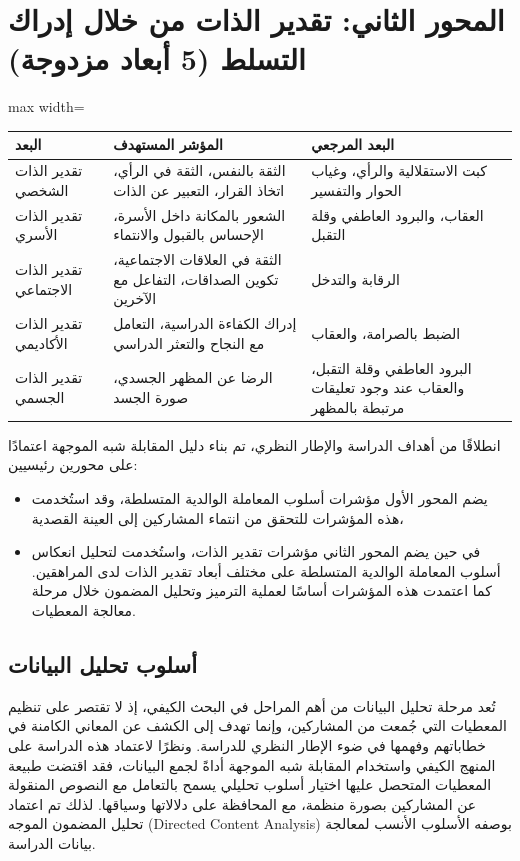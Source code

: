 \documentclass[12pt,oneside]{report}
\begin{document}
\section{المحور الثاني: تقدير الذات من خلال إدراك التسلط  (5 أبعاد مزدوجة)}
\begin{table}[H]
\centering
\small
\renewcommand{\arraystretch}{1.3}
\setlength{\tabcolsep}{4pt}
\begin{adjustbox}{max width=\textwidth}
\begin{tabular}{p{6cm} p{4cm} p{4cm}}
\toprule
\textbf{البعد} & \textbf{المؤشر المستهدف} & \textbf{البعد المرجعي} \\
\midrule
تقدير الذات الشخصي & الثقة بالنفس، الثقة في الرأي، اتخاذ القرار، التعبير عن الذات & كبت الاستقلالية والرأي، وغياب الحوار والتفسير \\
تقدير الذات الأسري & الشعور بالمكانة داخل الأسرة، الإحساس بالقبول والانتماء & العقاب، والبرود العاطفي وقلة التقبل \\
تقدير الذات الاجتماعي & الثقة في العلاقات الاجتماعية، تكوين الصداقات، التفاعل مع الآخرين & الرقابة والتدخل \\
تقدير الذات الأكاديمي & إدراك الكفاءة الدراسية، التعامل مع النجاح والتعثر الدراسي & الضبط بالصرامة، والعقاب \\
تقدير الذات الجسمي & الرضا عن المظهر الجسدي، صورة الجسد & البرود العاطفي وقلة التقبل، والعقاب عند وجود تعليقات مرتبطة بالمظهر \\
\bottomrule
\end{tabular}
\end{adjustbox}
\end{table}
انطلاقًا من أهداف الدراسة والإطار النظري، تم بناء دليل المقابلة شبه الموجهة اعتمادًا على محورين رئيسيين:

\begin{itemize}[leftmargin=1.6em,itemsep=1pt]
\item يضم المحور الأول مؤشرات أسلوب المعاملة الوالدية المتسلطة، وقد استُخدمت هذه المؤشرات للتحقق من انتماء المشاركين إلى العينة القصدية،
\item في حين يضم المحور الثاني مؤشرات تقدير الذات، واستُخدمت لتحليل انعكاس أسلوب المعاملة الوالدية المتسلطة على مختلف أبعاد تقدير الذات لدى المراهقين. كما اعتمدت هذه المؤشرات أساسًا لعملية الترميز وتحليل المضمون خلال مرحلة معالجة المعطيات.
\end{itemize}
\subsection{أسلوب تحليل البيانات}
تُعد مرحلة تحليل البيانات من أهم المراحل في البحث الكيفي، إذ لا تقتصر على تنظيم المعطيات التي جُمعت من المشاركين، وإنما تهدف إلى الكشف عن المعاني الكامنة في خطاباتهم وفهمها في ضوء الإطار النظري للدراسة. ونظرًا لاعتماد هذه الدراسة على المنهج الكيفي واستخدام المقابلة شبه الموجهة أداةً لجمع البيانات، فقد اقتضت طبيعة المعطيات المتحصل عليها اختيار أسلوب تحليلي يسمح بالتعامل مع النصوص المنقولة عن المشاركين بصورة منظمة، مع المحافظة على دلالاتها وسياقها. لذلك تم اعتماد تحليل المضمون الموجه (Directed Content Analysis) بوصفه الأسلوب الأنسب لمعالجة بيانات الدراسة.
\end{document}
